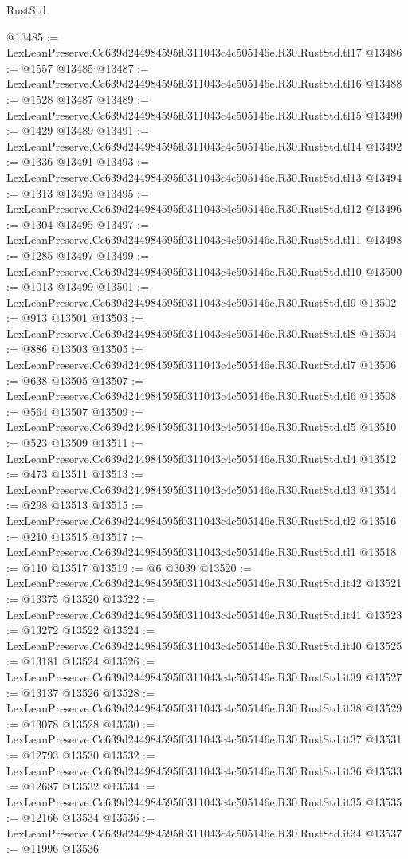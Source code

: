 \begin{lexlean}{RustStd}
\begin{coremodule}
@13485 := LexLeanPreserve.Cc639d244984595f0311043c4c505146e.R30.RustStd.tl17
@13486 := @1557 @13485
@13487 := LexLeanPreserve.Cc639d244984595f0311043c4c505146e.R30.RustStd.tl16
@13488 := @1528 @13487
@13489 := LexLeanPreserve.Cc639d244984595f0311043c4c505146e.R30.RustStd.tl15
@13490 := @1429 @13489
@13491 := LexLeanPreserve.Cc639d244984595f0311043c4c505146e.R30.RustStd.tl14
@13492 := @1336 @13491
@13493 := LexLeanPreserve.Cc639d244984595f0311043c4c505146e.R30.RustStd.tl13
@13494 := @1313 @13493
@13495 := LexLeanPreserve.Cc639d244984595f0311043c4c505146e.R30.RustStd.tl12
@13496 := @1304 @13495
@13497 := LexLeanPreserve.Cc639d244984595f0311043c4c505146e.R30.RustStd.tl11
@13498 := @1285 @13497
@13499 := LexLeanPreserve.Cc639d244984595f0311043c4c505146e.R30.RustStd.tl10
@13500 := @1013 @13499
@13501 := LexLeanPreserve.Cc639d244984595f0311043c4c505146e.R30.RustStd.tl9
@13502 := @913 @13501
@13503 := LexLeanPreserve.Cc639d244984595f0311043c4c505146e.R30.RustStd.tl8
@13504 := @886 @13503
@13505 := LexLeanPreserve.Cc639d244984595f0311043c4c505146e.R30.RustStd.tl7
@13506 := @638 @13505
@13507 := LexLeanPreserve.Cc639d244984595f0311043c4c505146e.R30.RustStd.tl6
@13508 := @564 @13507
@13509 := LexLeanPreserve.Cc639d244984595f0311043c4c505146e.R30.RustStd.tl5
@13510 := @523 @13509
@13511 := LexLeanPreserve.Cc639d244984595f0311043c4c505146e.R30.RustStd.tl4
@13512 := @473 @13511
@13513 := LexLeanPreserve.Cc639d244984595f0311043c4c505146e.R30.RustStd.tl3
@13514 := @298 @13513
@13515 := LexLeanPreserve.Cc639d244984595f0311043c4c505146e.R30.RustStd.tl2
@13516 := @210 @13515
@13517 := LexLeanPreserve.Cc639d244984595f0311043c4c505146e.R30.RustStd.tl1
@13518 := @110 @13517
@13519 := @6 @3039
@13520 := LexLeanPreserve.Cc639d244984595f0311043c4c505146e.R30.RustStd.it42
@13521 := @13375 @13520
@13522 := LexLeanPreserve.Cc639d244984595f0311043c4c505146e.R30.RustStd.it41
@13523 := @13272 @13522
@13524 := LexLeanPreserve.Cc639d244984595f0311043c4c505146e.R30.RustStd.it40
@13525 := @13181 @13524
@13526 := LexLeanPreserve.Cc639d244984595f0311043c4c505146e.R30.RustStd.it39
@13527 := @13137 @13526
@13528 := LexLeanPreserve.Cc639d244984595f0311043c4c505146e.R30.RustStd.it38
@13529 := @13078 @13528
@13530 := LexLeanPreserve.Cc639d244984595f0311043c4c505146e.R30.RustStd.it37
@13531 := @12793 @13530
@13532 := LexLeanPreserve.Cc639d244984595f0311043c4c505146e.R30.RustStd.it36
@13533 := @12687 @13532
@13534 := LexLeanPreserve.Cc639d244984595f0311043c4c505146e.R30.RustStd.it35
@13535 := @12166 @13534
@13536 := LexLeanPreserve.Cc639d244984595f0311043c4c505146e.R30.RustStd.it34
@13537 := @11996 @13536

\end{coremodule}
\end{lexlean}
